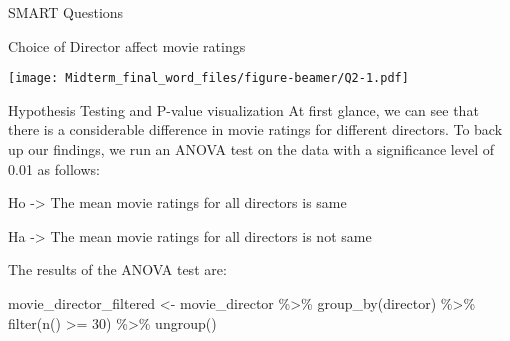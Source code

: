\documentclass[
  ignorenonframetext,
]{beamer}
\newenvironment{Shaded}{\begin{snugshade}}{\end{snugshade}}
\newcommand{\AttributeTok}[1]{\textcolor[rgb]{0.77,0.63,0.00}{#1}}
\newcommand{\DecValTok}[1]{\textcolor[rgb]{0.00,0.00,0.81}{#1}}
\newcommand{\FloatTok}[1]{\textcolor[rgb]{0.00,0.00,0.81}{#1}}
\newcommand{\FunctionTok}[1]{\textcolor[rgb]{0.00,0.00,0.00}{#1}}
\newcommand{\NormalTok}[1]{#1}
\newcommand{\OtherTok}[1]{\textcolor[rgb]{0.56,0.35,0.01}{#1}}
\newcommand{\SpecialCharTok}[1]{\textcolor[rgb]{0.00,0.00,0.00}{#1}}
\newcommand{\StringTok}[1]{\textcolor[rgb]{0.31,0.60,0.02}{#1}}
\begin{document}
\begin{frame}[fragile]{SMART Questions}
\begin{block}{Choice of Director affect movie ratings}
\begin{Shaded}
\end{Shaded}

\texttt{[image: Midterm\_final\_word\_files/figure-beamer/Q2-1.pdf]}

\begin{block}{Hypothesis Testing and P-value visualization}
\protect\hypertarget{hypothesis-testing-and-p-value-visualization-1}{}
At first glance, we can see that there is a considerable difference in
movie ratings for different directors. To back up our findings, we run
an ANOVA test on the data with a significance level of 0.01 as follows:

Ho -\textgreater{} The mean movie ratings for all directors is same

Ha -\textgreater{} The mean movie ratings for all directors is not same

The results of the ANOVA test are:

\begin{Shaded}
\begin{Highlighting}[]
\NormalTok{movie\_director\_filtered }\OtherTok{\textless{}{-}}\NormalTok{ movie\_director }\SpecialCharTok{\%\textgreater{}\%}
  \FunctionTok{group\_by}\NormalTok{(director) }\SpecialCharTok{\%\textgreater{}\%}
    \FunctionTok{filter}\NormalTok{(}\FunctionTok{n}\NormalTok{() }\SpecialCharTok{\textgreater{}=} \DecValTok{30}\NormalTok{) }\SpecialCharTok{\%\textgreater{}\%}
      \FunctionTok{ungroup}\NormalTok{()}


\end{Highlighting}
\end{Shaded}
\end{block}
\end{block}
\end{frame}
\end{document}

